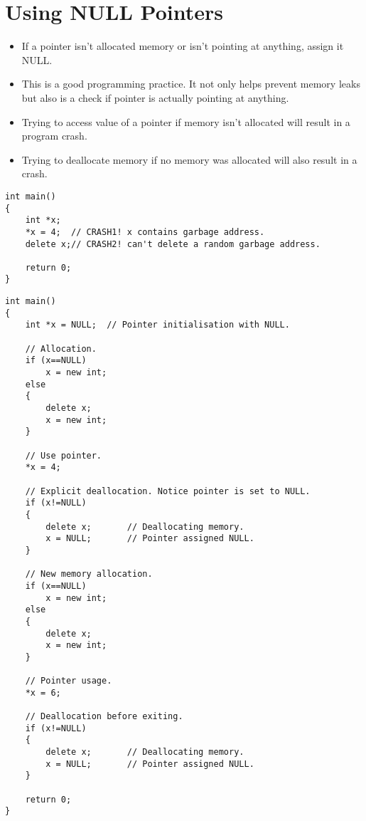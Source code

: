 \documentclass[12pt,a4paper]{article}
\begin{document}
\section{Using NULL Pointers}
\begin{itemize}
\item If a pointer isn't allocated memory or isn't pointing at anything, assign it NULL.
\item This is a good programming practice. It not only helps prevent memory leaks but also is a check if pointer is actually pointing at anything.
\item Trying to access value of a pointer if memory isn't allocated will result in a program crash.
\item Trying to deallocate memory if no memory was allocated will also result in a crash.
\end{itemize}
\begin{lstlisting}[caption={Two Typical Program Crashes}]
int main()
{
	int *x;
	*x = 4;	 // CRASH1! x contains garbage address.
	delete x;// CRASH2! can't delete a random garbage address.
	
	return 0;
}
\end{lstlisting}
\begin{lstlisting}[caption={Using NULL to Properly Handle Pointers}]
int main()
{
	int *x = NULL;	// Pointer initialisation with NULL.
	
	// Allocation.
	if (x==NULL)
		x = new int;
	else
	{
		delete x;
		x = new int;
	}
		
	// Use pointer.
	*x = 4;
	
	// Explicit deallocation. Notice pointer is set to NULL.
	if (x!=NULL)
	{
		delete x;		// Deallocating memory.
		x = NULL;		// Pointer assigned NULL.
	}

	// New memory allocation.
	if (x==NULL)
		x = new int;
	else
	{
		delete x;
		x = new int;
	}

	// Pointer usage.
	*x = 6;
	
	// Deallocation before exiting.
	if (x!=NULL)
	{
		delete x;		// Deallocating memory.
		x = NULL;		// Pointer assigned NULL.
	}
	
	return 0;
}
\end{lstlisting}
\end{document}
